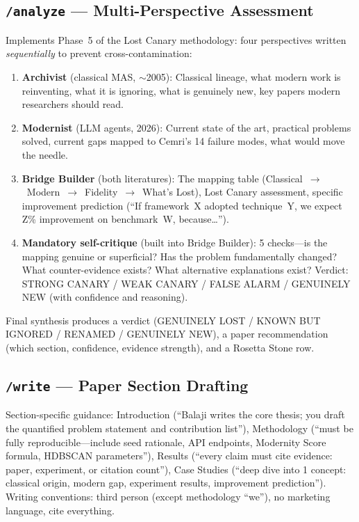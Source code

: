 \documentclass{article}
\begin{document}
\subsection{\texttt{/analyze} --- Multi-Perspective Assessment}

Implements Phase~5 of the Lost Canary methodology: four perspectives written
\emph{sequentially} to prevent cross-contamination:

\begin{enumerate}[nosep]
  \item \textbf{Archivist} (classical MAS, ${\sim}$2005): Classical lineage, what
    modern work is reinventing, what it is ignoring, what is genuinely new, key
    papers modern researchers should read.
  \item \textbf{Modernist} (LLM agents, 2026): Current state of the art, practical
    problems solved, current gaps mapped to Cemri's 14 failure modes, what would
    move the needle.
  \item \textbf{Bridge Builder} (both literatures): The mapping table
    (Classical~$\to$~Modern~$\to$~Fidelity~$\to$~What's Lost), Lost Canary
    assessment, specific improvement prediction (``If framework~X adopted
    technique~Y, we expect Z\% improvement on benchmark~W, because\ldots'').
  \item \textbf{Mandatory self-critique} (built into Bridge Builder): 5 checks---is
    the mapping genuine or superficial? Has the problem fundamentally changed? What
    counter-evidence exists? What alternative explanations exist? Verdict: STRONG
    CANARY / WEAK CANARY / FALSE ALARM / GENUINELY NEW (with confidence and
    reasoning).
\end{enumerate}

\noindent Final synthesis produces a verdict (GENUINELY LOST / KNOWN BUT IGNORED /
RENAMED / GENUINELY NEW), a paper recommendation (which section, confidence,
evidence strength), and a Rosetta Stone row.

\subsection{\texttt{/write} --- Paper Section Drafting}

Section-specific guidance: Introduction (``Balaji writes the core thesis; you draft
the quantified problem statement and contribution list''), Methodology (``must be
fully reproducible---include seed rationale, API endpoints, Modernity Score formula,
HDBSCAN parameters''), Results (``every claim must cite evidence: paper, experiment,
or citation count''), Case Studies (``deep dive into 1 concept: classical origin,
modern gap, experiment results, improvement prediction''). Writing conventions:
third person (except methodology ``we''), no marketing language, cite everything.
\end{document}
